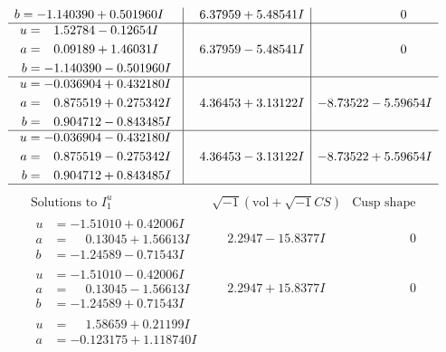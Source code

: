 \documentclass[1p]{elsarticle_modified}
\theoremstyle{definition}
\newcommand{\I}{\sqrt{-1}}
\begin{document}
$$\begin{array}{c|c|c}
\begin{aligned}
b &= -1.140390 + 0.501960 I\end{aligned}
 & \phantom{-}6.37959 + 5.48541 I & \phantom{-0.000000 } 0 \\ \hline\begin{aligned}
u &= \phantom{-}1.52784 - 0.12654 I \\
a &= \phantom{-}0.09189 + 1.46031 I \\
b &= -1.140390 - 0.501960 I\end{aligned}
 & \phantom{-}6.37959 - 5.48541 I & \phantom{-0.000000 } 0 \\ \hline\begin{aligned}
u &= -0.036904 + 0.432180 I \\
a &= \phantom{-}0.875519 + 0.275342 I \\
b &= \phantom{-}0.904712 - 0.843485 I\end{aligned}
 & \phantom{-}4.36453 + 3.13122 I & -8.73522 - 5.59654 I \\ \hline\begin{aligned}
u &= -0.036904 - 0.432180 I \\
a &= \phantom{-}0.875519 - 0.275342 I \\
b &= \phantom{-}0.904712 + 0.843485 I\end{aligned}
 & \phantom{-}4.36453 - 3.13122 I & -8.73522 + 5.59654 I\\
 \hline 
 \end{array}$$\newpage$$\begin{array}{c|c|c}  
\text{Solutions to }I^u_{1}& \I (\text{vol} + \sqrt{-1}CS) & \text{Cusp shape}\\
 \hline 
\begin{aligned}
u &= -1.51010 + 0.42006 I \\
a &= \phantom{-}0.13045 + 1.56613 I \\
b &= -1.24589 - 0.71543 I\end{aligned}
 & \phantom{-}2.2947 - 15.8377 I & \phantom{-0.000000 } 0 \\ \hline\begin{aligned}
u &= -1.51010 - 0.42006 I \\
a &= \phantom{-}0.13045 - 1.56613 I \\
b &= -1.24589 + 0.71543 I\end{aligned}
 & \phantom{-}2.2947 + 15.8377 I & \phantom{-0.000000 } 0 \\ \hline\begin{aligned}
u &= \phantom{-}1.58659 + 0.21199 I \\
a &= -0.123175 + 1.118740 I \\

\end{aligned}
\end{array}$$
\end{document}
